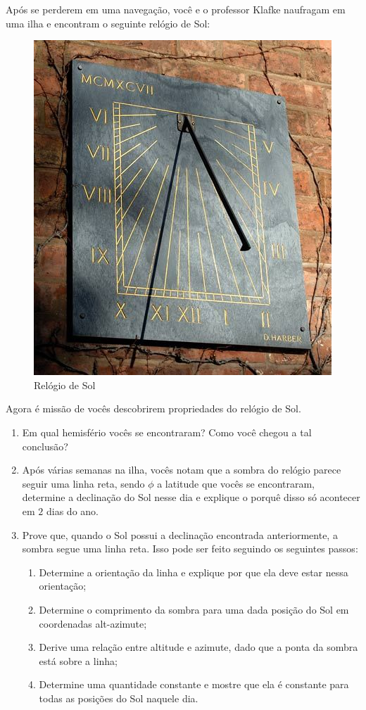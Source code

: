 \documentclass[11pt]{article}
\begin{document}
\begin{pproblem} Após se perderem em uma navegação, você e o professor Klafke naufragam em uma ilha e encontram o seguinte relógio de Sol:
    \begin{figure}[H]
        \centering
        \includegraphics[width=0.5\linewidth]{imagens/q6.jpg}
        \caption{Relógio de Sol}
    \end{figure}
    Agora é missão de vocês descobrirem propriedades do relógio de Sol.
    \begin{enumerate}[label=\textbf{\alph*)}]
        \item Em qual hemisfério vocês se encontraram? Como você chegou a tal conclusão?
        \item Após várias semanas na ilha, vocês notam que a sombra do relógio parece seguir uma linha reta, sendo \(\phi\) a latitude que vocês se encontraram, determine a declinação do Sol nesse dia e explique o porquê disso só acontecer em \(2\) dias do ano.
        \item Prove que, quando o Sol possui a declinação encontrada anteriormente, a sombra segue uma linha reta. Isso pode ser feito seguindo os seguintes passos:
        \begin{enumerate}[label=\roman*)]
            \item Determine a orientação da linha e explique por que ela deve estar nessa orientação;
            \item Determine o comprimento da sombra para uma dada posição do Sol em coordenadas alt-azimute;
            \item Derive uma relação entre altitude e azimute, dado que a ponta da sombra está sobre a linha;
            \item Determine uma quantidade constante e mostre que ela é constante para todas as posições do Sol naquele dia.
        \end{enumerate}
    \end{enumerate}
\end{pproblem}
\end{document}
